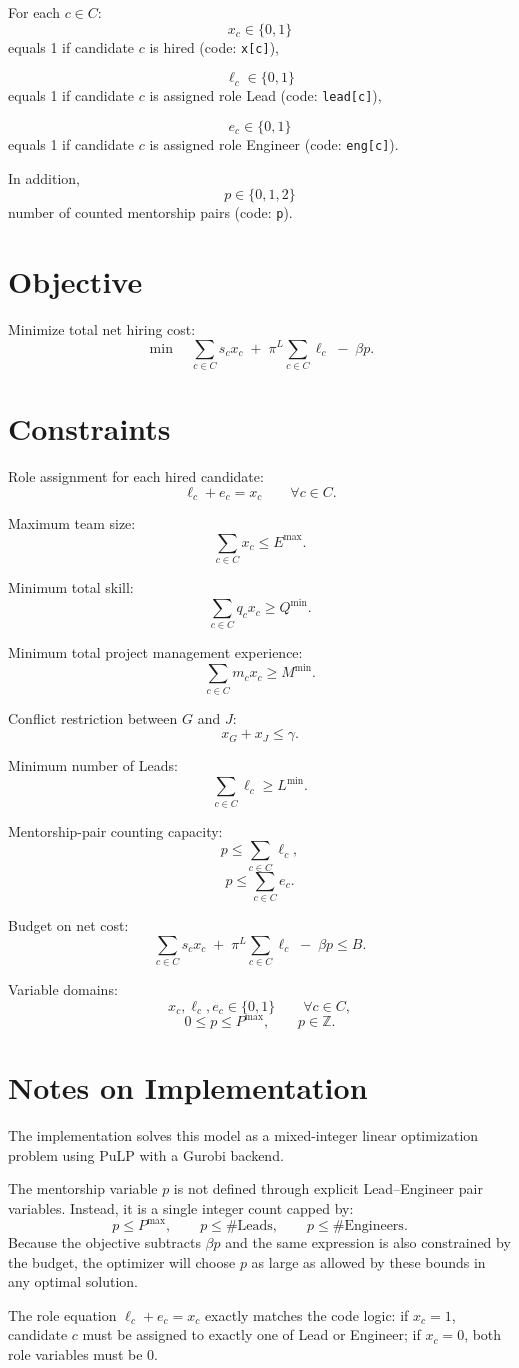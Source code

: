 For each \(c \in C\):
\[
x_c \in \{0,1\}
\]
equals 1 if candidate \(c\) is hired (code: \texttt{x[c]}),

\[
\ell_c \in \{0,1\}
\]
equals 1 if candidate \(c\) is assigned role Lead (code: \texttt{lead[c]}),

\[
e_c \in \{0,1\}
\]
equals 1 if candidate \(c\) is assigned role Engineer (code: \texttt{eng[c]}).

In addition,
\[
p \in \{0,1,2\}
\]
number of counted mentorship pairs (code: \texttt{p}).

\section*{Objective}

Minimize total net hiring cost:
\[
\min \quad \sum_{c\in C} s_c x_c \;+\; \pi^{L}\sum_{c\in C}\ell_c \;-\; \beta p.
\]

\section*{Constraints}

Role assignment for each hired candidate:
\[
\ell_c + e_c = x_c \qquad \forall c \in C.
\]

Maximum team size:
\[
\sum_{c\in C} x_c \le E^{\max}.
\]

Minimum total skill:
\[
\sum_{c\in C} q_c x_c \ge Q^{\min}.
\]

Minimum total project management experience:
\[
\sum_{c\in C} m_c x_c \ge M^{\min}.
\]

Conflict restriction between \(G\) and \(J\):
\[
x_G + x_J \le \gamma.
\]

Minimum number of Leads:
\[
\sum_{c\in C} \ell_c \ge L^{\min}.
\]

Mentorship-pair counting capacity:
\[
p \le \sum_{c\in C} \ell_c,
\]
\[
p \le \sum_{c\in C} e_c.
\]

Budget on net cost:
\[
\sum_{c\in C} s_c x_c \;+\; \pi^{L}\sum_{c\in C}\ell_c \;-\; \beta p \le B.
\]

Variable domains:
\[
x_c,\ell_c,e_c \in \{0,1\}\qquad \forall c\in C,
\]
\[
0 \le p \le P^{\max}, \qquad p \in \mathbb{Z}.
\]

\section*{Notes on Implementation}

The implementation solves this model as a mixed-integer linear optimization problem using PuLP with a Gurobi backend.

The mentorship variable \(p\) is not defined through explicit Lead--Engineer pair variables. Instead, it is a single integer count capped by:
\[
p \le P^{\max},\qquad
p \le \#\text{Leads},\qquad
p \le \#\text{Engineers}.
\]
Because the objective subtracts \(\beta p\) and the same expression is also constrained by the budget, the optimizer will choose \(p\) as large as allowed by these bounds in any optimal solution.

The role equation \(\ell_c + e_c = x_c\) exactly matches the code logic: if \(x_c=1\), candidate \(c\) must be assigned to exactly one of Lead or Engineer; if \(x_c=0\), both role variables must be 0.
